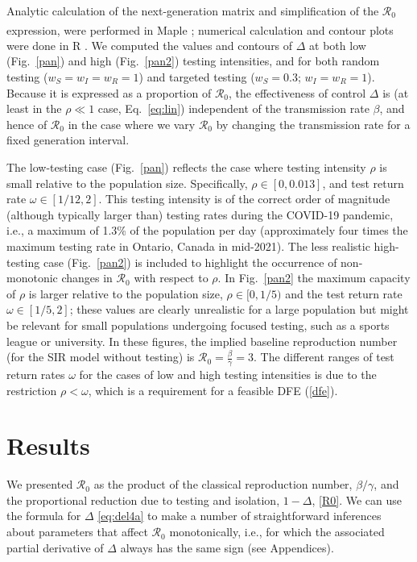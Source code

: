 \documentclass[smallextended]{svjour3}       %
\newcommand{\fref}[1]{Fig.~\ref{#1}}
\newcommand{\Rnum}{\ensuremath{\mathcal{R}_0}\xspace}
\newcommand{\covid}{COVID-19\xspace}
\DeclareRobustCommand\_{\ifmmode\expandafter\subtxt\else\textunderscore\fi}
\begin{document}
Analytic calculation of the next-generation matrix and simplification of the $\Rnum$ expression, were performed in Maple\textsuperscript{\texttrademark} \citep{maple14}; numerical calculation and contour plots were done in R \citep{r}.
We computed the values and contours of $\Delta$ at both low (\fref{pan}) and high (\fref{pan2}) testing intensities, and for both random testing ($w_S=w_I=w_R=1$) and targeted testing ($w_S=0.3$; $w_I=w_R=1$). Because it is expressed as a proportion of $\Rnum$, the effectiveness of control $\Delta$ is (at least in the $\rho \ll 1$ case, Eq.~\ref{eq:lin}) independent of the transmission rate $\beta$, and hence of $\Rnum$ in the case where we vary $\Rnum$ by changing the transmission rate for a fixed generation interval.

The low-testing case (\fref{pan}) reflects the case where testing intensity $\rho$ is small relative to the population size. Specifically, $\rho \in [0,0.013]$, and test return rate $\omega\in [1/12,2]$. This testing intensity is of the correct order of magnitude (although typically larger than) testing rates during the \covid pandemic, i.e., a maximum of 1.3\% of the population per day (approximately four times the maximum testing rate in Ontario, Canada in mid-2021). The less realistic high-testing case (\fref{pan2}) is included to highlight the occurrence of non-monotonic changes in $\Rnum$ with respect to $\rho$.
In \fref{pan2} the maximum capacity of $\rho$ is larger relative to the population size, $\rho \in [0,1/5)$ and the test return rate $\omega\in [1/5,2]$; these values are clearly unrealistic for a large population but might be relevant for small populations undergoing focused testing, such as a sports league or university. In these figures, the implied baseline reproduction number (for the SIR model without testing) is $\Rnum=\frac{\beta}{\gamma}=3$.  The different ranges of test return rates $\omega$ for the cases of low and high testing intensities is due to the restriction $\rho<\omega$, which is a requirement for a feasible DFE (\ref{dfe}).

\section{Results}
\label{resu}

We presented $\Rnum$ as the product of the classical reproduction number, $\beta/\gamma$, and the proportional reduction due to testing and isolation, $1-\Delta$, \eqref{R0}.
We can use the formula for $\Delta$ \eqref{eq:del4a} to make a number of straightforward inferences about parameters that affect $\Rnum$ monotonically, i.e., for which the associated partial derivative of $\Delta$ always has the same sign (see Appendices).
\end{document}

